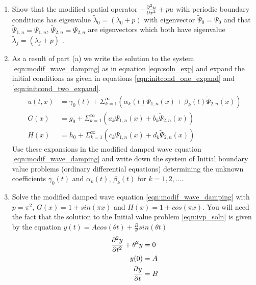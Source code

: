 \begin{enumerate}
\item Show that the modified spatial operator $-\frac{\partial^{2} u}{\partial x^{2}} + pu$ with periodic boundary conditions has eigenvalue $\tilde{\lambda}_0 = \left(\lambda_{0} + p\right)$ with eigenvector $\tilde{\Psi}_0 = \Psi_0$ and that $\tilde{\Psi}_{1,n} = \Psi_{1,n}$, $\tilde{\Psi}_{2,n} = \Psi_{2,n}$ are eigenvectors which both have eigenvalue $\tilde{\lambda}_{j} = \left( \lambda_{j} + p \right)$ .  

\item As a result of part (a) we write the solution to  the system \eqref{eqn:modif_wave_damping} as in equation \eqref{eqn:soln_exp} and expand the initial conditions as given in equations \eqref{eqn:initcond_one_expand} and \eqref{eqn:initcond_two_expand}.
\begin{align}
	u(t,x) &= \gamma_{0}(t) + \Sigma_{k=1}^{\infty} \left( \alpha_{k}(t)\tilde{\Psi}_{1,n}(x) + \beta_{k}(t)\tilde{\Psi}_{2,n}(x) \right)\label{eqn:soln_exp} \\
	G(x) & = g_0 + \Sigma_{k=1}^{\infty} \left( a_{k}{\Psi}_{1,n}(x) + b_{k}\tilde{\Psi}_{2,n}(x) \right) \label{eqn:initcond_one_expand}\\
	H(x) & = h_0 +  \Sigma_{k=1}^{\infty} \left( c_{k}{\Psi}_{1,n}(x) + d_{k}\tilde{\Psi}_{2,n}(x) \right)\label{eqn:initcond_two_expand}
\end{align}
Use these expansions in the modified damped wave equation \eqref{eqn:modif_wave_damping} and write down the system of Initial boundary value problems (ordinary differential equations) determining the unknown coefficients $\gamma_{0}(t)$ and $\alpha_{k}(t)$, $\beta_{k}(t)$ for $k = 1,2,\ldots$. 

\item Solve the modified damped wave equation \eqref{eqn:modif_wave_damping} with $p=\pi^2$, $G(x) = 1 + sin(\pi x)$ and $H(x) = 1 + cos(\pi x)$.  You will need the fact that the solution to the Initial value problem \eqref{eqn:ivp_soln} is given by the equation $y(t) = A cos(\theta t) + \frac{B}{\theta} sin(\theta t)$
\begin{align}
\frac{\partial^{2} y}{\partial t^{2}} + \theta^{2}y & = 0 \label{eqn:ivp_soln}\\
y(0) & = A \nonumber \\
\frac{\partial^{} y}{\partial t^{}} & = B \nonumber
\end{align}




\end{enumerate}



